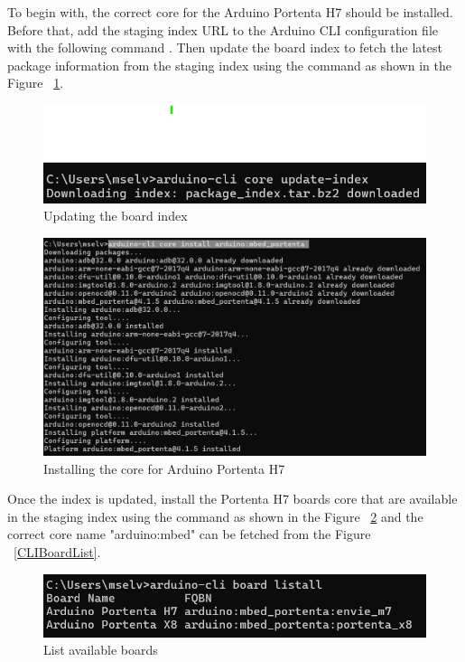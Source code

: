 To begin with, the correct core for the Arduino Portenta H7 should be installed. Before that, add the staging index URL to the Arduino CLI configuration file  with the following command . Then update the board index to fetch the latest package information from the staging index using the command  as shown in the Figure ~\ref{CoreIndex}.
\begin{figure}
	\begin{center}
		\includegraphics[width=0.7\linewidth]{Images/ArduinoCLI/CoreIndex.png}
		\caption{Updating the board index}
		\label{CoreIndex}
	\end{center}
\end{figure}
\begin{figure}
	\begin{center}
		\includegraphics[width=0.7\linewidth]{Images/ArduinoCLI/CoreInstall.png}
		\caption{Installing the core for Arduino Portenta H7}
		\label{CoreInstall}
	\end{center}
\end{figure}

Once the index is updated, install the Portenta H7 boards core that are available in the staging index using the command  as shown in the Figure ~\ref{CoreInstall} and the correct core name "arduino:mbed" can be fetched from the Figure ~\ref{CLIBoardList}.
\begin{figure}
	\begin{center}
		\includegraphics[width=0.7\linewidth]{Images/ArduinoCLI/Listall.png}
		\caption{List available boards}
		\label{Listall}
	\end{center}
\end{figure}

